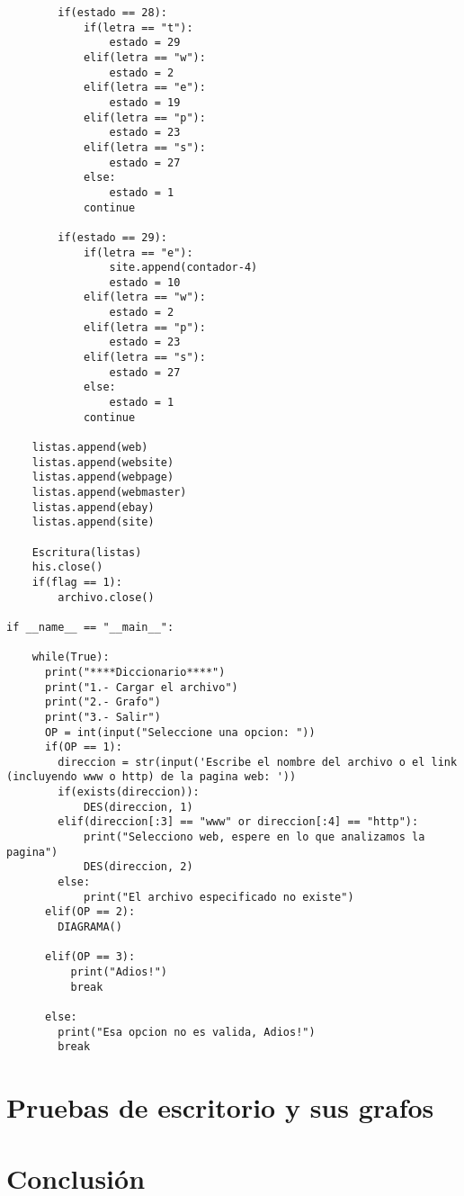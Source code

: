 \documentclass{article}
\begin{document}
\begin{lstlisting}
        if(estado == 28):
            if(letra == "t"):
                estado = 29
            elif(letra == "w"):
                estado = 2
            elif(letra == "e"):
                estado = 19
            elif(letra == "p"):
                estado = 23
            elif(letra == "s"):
                estado = 27
            else:
                estado = 1
            continue
        
        if(estado == 29):
            if(letra == "e"):
                site.append(contador-4)
                estado = 10
            elif(letra == "w"):
                estado = 2
            elif(letra == "p"):
                estado = 23
            elif(letra == "s"):
                estado = 27
            else:
                estado = 1
            continue
        
    listas.append(web)
    listas.append(website)
    listas.append(webpage)
    listas.append(webmaster)
    listas.append(ebay)
    listas.append(site)
    
    Escritura(listas)
    his.close()    
    if(flag == 1):
        archivo.close()       
        
if __name__ == "__main__":

    while(True):
      print("****Diccionario****")  
      print("1.- Cargar el archivo")
      print("2.- Grafo")
      print("3.- Salir")
      OP = int(input("Seleccione una opcion: "))
      if(OP == 1):
        direccion = str(input('Escribe el nombre del archivo o el link (incluyendo www o http) de la pagina web: '))
        if(exists(direccion)):
            DES(direccion, 1)
        elif(direccion[:3] == "www" or direccion[:4] == "http"):
            print("Selecciono web, espere en lo que analizamos la pagina")
            DES(direccion, 2)
        else:
            print("El archivo especificado no existe")
      elif(OP == 2):
        DIAGRAMA()
        
      elif(OP == 3):
          print("Adios!")
          break

      else:
        print("Esa opcion no es valida, Adios!")
        break
\end{lstlisting}

\section{Pruebas de escritorio y sus grafos}


\section{Conclusi\'on}
\end{document}
